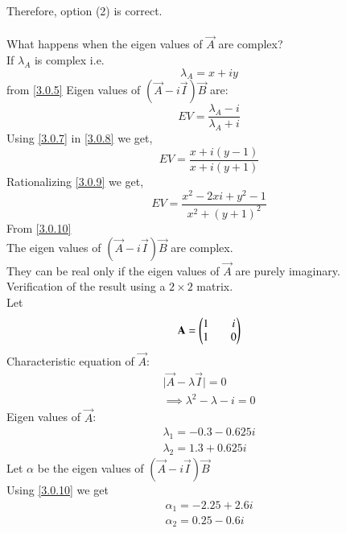 \documentclass[journal,12pt,twocolumn]{IEEEtran}
\begin{document}
 Therefore, option (2) is correct.\\
 \\
 What happens when the eigen values of $\vec{A}$ are complex?\\
 If $\lambda_A$ is complex i.e.
 \begin{equation}\label{3.0.7}
 \lambda_A = x + iy
 \end{equation}
 from \eqref{3.0.5} Eigen values of $(\vec{A}-i\vec{I})\vec{B}$ are:\\
 \begin{equation}\label{3.0.8}
 EV = \frac{\lambda_A-i}{\lambda_A+i}
 \end{equation}
 Using \eqref{3.0.7} in \eqref{3.0.8} we get,
 \begin{equation}\label{3.0.9}
 EV = \frac{x+i(y-1)}{x+i(y+1)}
 \end{equation}
 Rationalizing \eqref{3.0.9} we get,
 \begin{equation}\label{3.0.10}
 EV = \frac{x^2-2xi+y^2-1}{x^2+(y+1)^2}
 \end{equation}
 From \eqref{3.0.10}\\
 The eigen values of $(\vec{A}-i\vec{I})\vec{B}$ are complex.\\
 They can be real only if the eigen values of $\vec{A}$ are purely imaginary.\\
 Verification of the result using a $2\times2$ matrix.\\
 Let 
 \begin{equation}\label{3.0.11}
 \mathbf{A} = \begin{pmatrix}1 && i \\ 1 && 0\end{pmatrix}
 \end{equation}
 Characteristic equation of $\vec{A}$:
 \begin{equation}\label{3.0.12}
 \begin{split}
 \vert\vec{A}-\lambda\vec{I}\vert = 0\\
 \implies \lambda^2 - \lambda - i = 0
 \end{split}
 \end{equation}
 Eigen values of $\vec{A}$:
 \begin{equation}\label{3.0.13}
 \begin{split}
 \lambda_1 = -0.3 - 0.625i \\
 \lambda_2 = 1.3 + 0.625i
 \end{split}
 \end{equation}
 Let $\alpha$ be the eigen values of $(\vec{A}-i\vec{I})\vec{B}$ \\
 Using \eqref{3.0.10} we get 
 \begin{equation}\label{3.0.14}
 \begin{split}
 \alpha_1 = -2.25 + 2.6i \\
 \alpha_2 = 0.25 - 0.6i
 \end{split}
 \end{equation}
\end{document}
